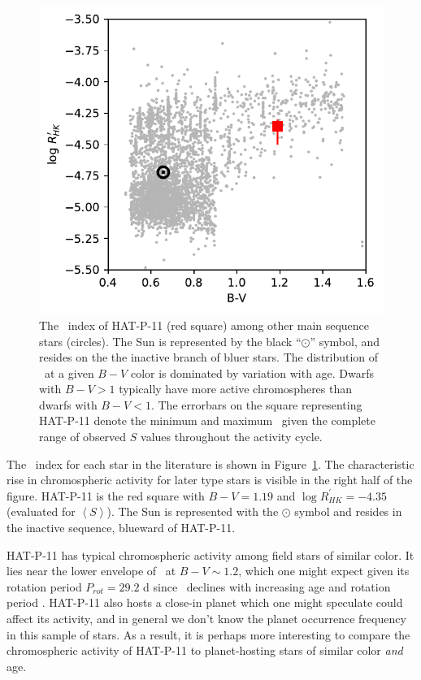 \begin{figure}
\begin{center}
\includegraphics[scale=1]{sindex/rprime.pdf}
\end{center}
\caption{The \rprime\ index of HAT-P-11 (red square) among other main sequence stars (circles). The Sun is represented by the black ``$\odot$'' symbol, and resides on the the inactive branch of bluer stars. The distribution of \rprime\ at a given $B-V$ color is dominated by variation with age. Dwarfs with $B-V > 1$ typically have more active chromospheres than dwarfs with $B-V <1$. The errorbars on the square representing HAT-P-11 denote the minimum and maximum \rprime\ given the complete range of observed $S$ values throughout the activity cycle.}
\label{fig:rprime_ms}
\end{figure}

The \rprime\ index for each star in the literature is shown in Figure~\ref{fig:rprime_ms}. The characteristic rise in chromospheric activity for later type stars is visible in the right half of the figure. HAT-P-11 is the red square with $B-V = 1.19$ and $\log R^\prime_{HK} = -4.35$ (evaluated for $\left<S\right>$). The Sun is represented with the $\odot$ symbol and resides in the inactive sequence, blueward of HAT-P-11. 

HAT-P-11 has typical chromospheric activity among field stars of similar color. It lies near the lower envelope of \rprime\ at $B-V\sim1.2$, which one might expect given its rotation period $P_{rot} = 29.2$ d since \rprime\ declines with increasing age and rotation period \citep{Noyes1984}. HAT-P-11 also hosts a close-in planet which one might speculate could affect its activity, and in general we don't know the planet occurrence frequency in this sample of stars. As a result, it is perhaps more interesting to compare the chromospheric activity of HAT-P-11 to planet-hosting stars of similar color \textit{and} age.

